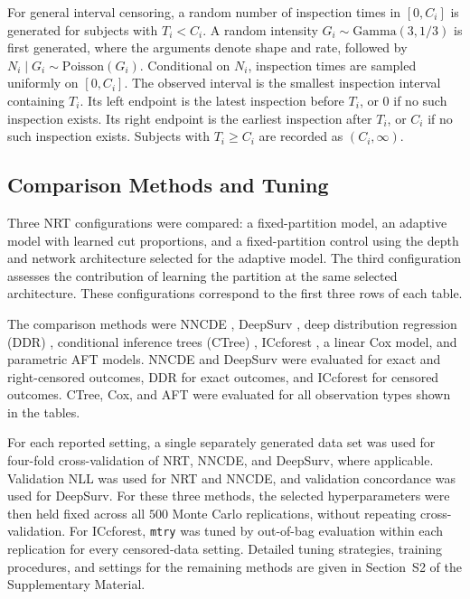 \documentclass[11pt]{article}
\numberwithin{equation}{section}
\begin{document}
For general interval censoring, a random number of inspection times in $[0,C_i]$ is generated for subjects with $T_i<C_i$. A random intensity $G_i\sim\mathrm{Gamma}(3,1/3)$ is first generated, where the arguments denote shape and rate, followed by $N_i\mid G_i\sim\mathrm{Poisson}(G_i)$. Conditional on $N_i$, inspection times are sampled uniformly on $[0,C_i]$. The observed interval is the smallest inspection interval containing $T_i$. Its left endpoint is the latest inspection before $T_i$, or $0$ if no such inspection exists. Its right endpoint is the earliest inspection after $T_i$, or $C_i$ if no such inspection exists. Subjects with $T_i\geq C_i$ are recorded as $(C_i,\infty)$.

\subsection{Comparison Methods and Tuning}
\label{subsec:simulation-tuning}
Three NRT configurations were compared: a fixed-partition model, an adaptive model with learned cut proportions, and a fixed-partition control using the depth and network architecture selected for the adaptive model. The third configuration assesses the contribution of learning the partition at the same selected architecture. These configurations correspond to the first three rows of each table.

The comparison methods were NNCDE \citep{hu_conditional_2023}, DeepSurv \citep{katzman_deepsurv_2018}, deep distribution regression (DDR) \citep{li_deep_2021}, conditional inference trees (CTree) \citep{hothorn_unbiased_2006,fu_survival_2017}, ICcforest \citep{yao_ensemble_2021}, a linear Cox model, and parametric AFT models. NNCDE and DeepSurv were evaluated for exact and right-censored outcomes, DDR for exact outcomes, and ICcforest for censored outcomes. CTree, Cox, and AFT were evaluated for all observation types shown in the tables.

For each reported setting, a single separately generated data set was used for four-fold cross-validation of NRT, NNCDE, and DeepSurv, where applicable. Validation NLL was used for NRT and NNCDE, and validation concordance was used for DeepSurv. For these three methods, the selected hyperparameters were then held fixed across all $500$ Monte Carlo replications, without repeating cross-validation. For ICcforest, \texttt{mtry} was tuned by out-of-bag evaluation within each replication for every censored-data setting. Detailed tuning strategies, training procedures, and settings for the remaining methods are given in Section~S2 of the Supplementary Material.
\end{document}
